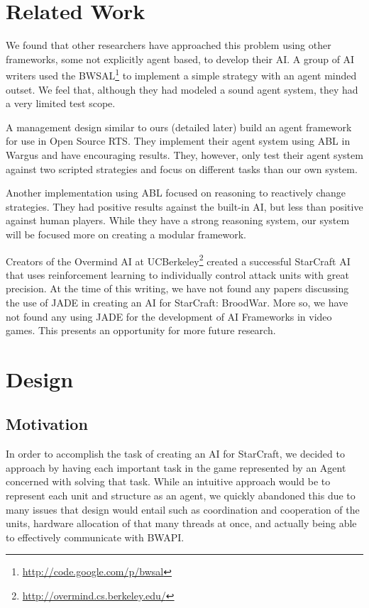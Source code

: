 \documentclass[letterpaper]{article}
\begin{document}

\section{Related Work}
We found that other researchers have approached this problem using other frameworks, some not explicitly agent based, to develop their AI.  A group of AI writers\cite{CrapPaper} used the BWSAL\footnote{\url{http://code.google.com/p/bwsal}} to implement a simple strategy with an agent minded outset.  We feel that, although they had modeled a sound agent system, they had a very limited test scope.

A management design similar to ours (detailed later) build an agent framework for use in Open Source RTS\cite{McCoy}.  They implement their agent system using ABL in Wargus and have encouraging results.  They, however, only test their agent system against two scripted strategies and focus on different tasks than our own system.  

Another implementation using ABL\cite{Weber} focused on reasoning to reactively change strategies.  They had positive results against the built-in AI, but less than positive against human players.  While they have a strong reasoning system, our system will be focused more on creating a modular framework.

Creators of the Overmind AI at UCBerkeley\footnote{\url{http://overmind.cs.berkeley.edu/}} created a successful StarCraft AI that uses reinforcement learning to individually control attack units with great precision.
At the time of this writing, we have not found any papers discussing the use of JADE in creating an AI for StarCraft: BroodWar.  More so, we have not found any using JADE for the development of AI Frameworks in video games.  This presents an opportunity for more future research.

\section{Design}
\subsection{Motivation}
In order to accomplish the task of creating an AI for StarCraft, we decided to approach by having each important task in the game represented by an Agent concerned with solving that task.  While an intuitive approach would be to represent each unit and structure as an agent, we quickly abandoned this due to many issues that design would entail such as coordination and cooperation of the units,  hardware allocation of that many threads at once, and actually being able to effectively communicate with BWAPI.
\end{document}
